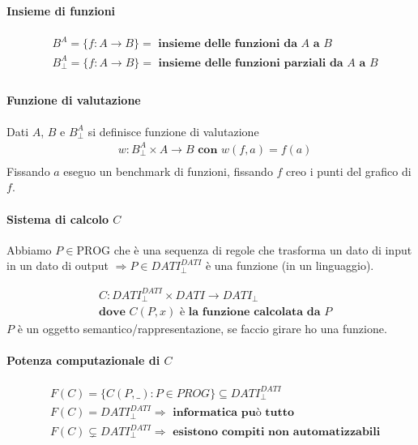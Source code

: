 \documentclass{article}
\begin{document}
\paragraph{Insieme di funzioni}
\begin{displaymath}
    \begin{split}
        &B^A = \{ f:A \rightarrow B\} = \textbf{ insieme delle funzioni da $A$ a $B$} \\
        &B_{\perp}^{A} = \{ f:A \rightarrow B\} = \textbf{ insieme delle funzioni parziali da $A$ a $B$} \\
    \end{split}
\end{displaymath}
\paragraph{Funzione di valutazione}
Dati $A$, $B$ e $B_{\perp}^{A}$ si definisce funzione di valutazione
\begin{displaymath}
    \begin{split}
        &w:B_{\perp}^{A} \times A \rightarrow B \textbf{ con } w(f,a) = f(a) \\
    \end{split}
\end{displaymath}
Fissando $a$ eseguo un benchmark di funzioni, fissando $f$ creo i punti del grafico di $f$.

\paragraph{Sistema di calcolo $C$}
Abbiamo $P \in \text{PROG}$ che è una sequenza di regole che trasforma un dato di input in un dato di output $\Rightarrow P \in \textit{DATI}_{\perp}^{\textit{DATI}}$ è una funzione (in un linguaggio).

\begin{displaymath}
\begin{split}
    &C:\textit{DATI}_{\perp}^{\textit{DATI}} \times \textit{DATI} \rightarrow \textit{DATI}_{\perp} \\
    &\textbf{dove } C(P,x) \textbf{ è la funzione calcolata da $P$}
\end{split}
\end{displaymath}
$P$ è un oggetto semantico/rappresentazione, se faccio girare ho una funzione.
\paragraph{Potenza computazionale di $C$}
\begin{displaymath}
\begin{split}
    &F(C)= \{ C(P,\_): P \in \textit{PROG}\} \subseteq \textit{DATI}_{\perp}^{\textit{DATI}}  \\
    &F(C) = \textit{DATI}_{\perp}^{\textit{DATI}} \Rightarrow \textbf{ informatica può tutto} \\
    &F(C) \subsetneq \textit{DATI}_{\perp}^{\textit{DATI}} \Rightarrow \textbf{ esistono compiti non automatizzabili} 
\end{split}
\end{displaymath}
\end{document}
